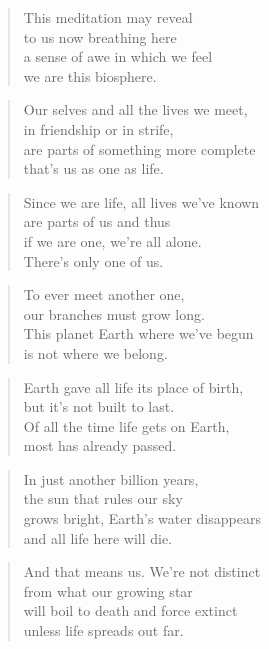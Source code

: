 \documentclass[10pt,a4paper]{article}
\begin{document}
\begin{paracol}{2}
\begin{verse}
This meditation may reveal\\
to us now breathing here\\
a sense of awe in which we feel\\
we are this biosphere.
\end{verse}

\begin{verse}
Our selves and all the lives we meet,\\
in friendship or in strife,\\
are parts of something more complete\\
that’s us as one as life.
\end{verse}

\begin{verse}
Since we are life, all lives we’ve known\\
are parts of us and thus\\
if we are one, we’re all alone.\\
There’s only one of us.
\end{verse}

\begin{verse}
To ever meet another one,\\
our branches must grow long.\\
This planet Earth where we’ve begun\\
is not where we belong.
\end{verse}

\begin{verse}
Earth gave all life its place of birth,\\
but it’s not built to last.\\
Of all the time life gets on Earth,\\
most has already passed.
\end{verse}

\begin{verse}
In just another billion years,\\
the sun that rules our sky\\
grows bright, Earth’s water disappears\\
and all life here will die.
\end{verse}

\begin{verse}
And that means us. We’re not distinct\\
from what our growing star\\
will boil to death and force extinct\\
unless life spreads out far.
\end{verse}


\end{paracol}
\end{document}
